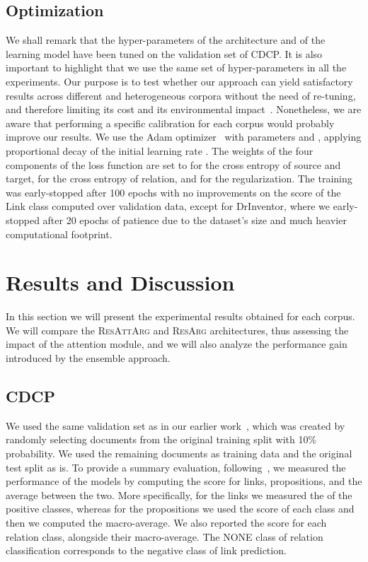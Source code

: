 \documentclass[journal]{IEEEtran}
\begin{document}
\subsection{Optimization}

We shall remark that the hyper-parameters of the architecture and of the learning model have been tuned on the validation set of CDCP. It is also important to highlight that we use the same set of hyper-parameters in all the experiments.
Our purpose is to test whether our approach can yield satisfactory results across different and heterogeneous corpora without the need of re-tuning, and therefore limiting its cost and its environmental impact~\cite{NLPenergy}.
Nonetheless, we are aware that performing a specific calibration for each corpus would probably improve our results.
We use the Adam optimizer~\cite{DBLP:journals/corr/KingmaB14} with parameters  and , applying proportional decay of the initial learning rate .
The weights of the four components of the loss function are set to  for the cross entropy of source and target,  for the cross entropy of relation, and  for the regularization.
The training was early-stopped after 100 epochs with no improvements on the  score of the Link class computed over validation data, except for DrInventor, where we early-stopped after 20 epochs of patience due to the dataset's size and much heavier computational footprint. 

\section{Results and Discussion}
\label{sec:results}

In this section we will present the experimental results obtained for each corpus. We will compare the \textsc{ResAttArg} and \textsc{ResArg} architectures, thus assessing the impact of the attention module, and we will also analyze the performance gain introduced by the ensemble approach.


\subsection{CDCP}

We used the same validation set as in our earlier work~\cite{W18-5201}, which was created by randomly selecting documents from the original training split with 10\% probability. We used the remaining documents as training data and the original test split as is.
To provide a summary evaluation, following~\cite{DBLP:conf/acl/NiculaePC17}, we measured the performance of the models by computing the  score for links, propositions, and the average between the two. More specifically, for the links we measured the  of the positive classes, whereas for the propositions we used the score of each class and then we computed the macro-average. We also reported the  score for each relation class, alongside their macro-average. The NONE class of relation classification corresponds to the negative class of link prediction.
\end{document}
